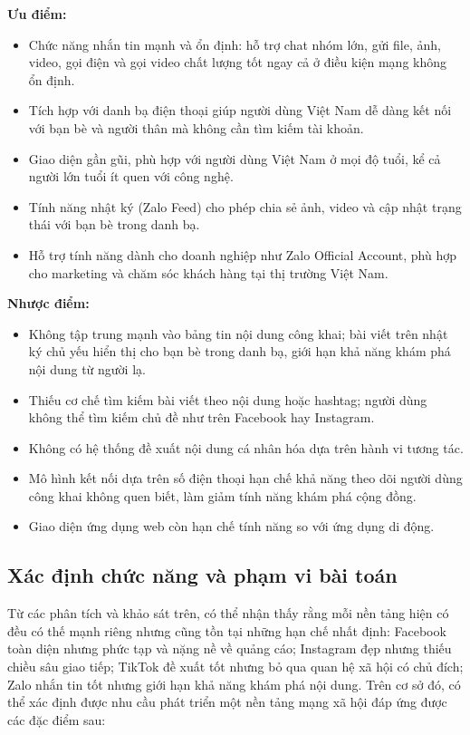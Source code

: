 \documentclass[../DoAn.tex]{subfiles}
\begin{document}
\noindent\textbf{Ưu điểm:}
\begin{itemize}
    \item Chức năng nhắn tin mạnh và ổn định: hỗ trợ chat nhóm lớn, gửi file, ảnh, video, gọi điện và gọi video chất lượng tốt ngay cả ở điều kiện mạng không ổn định.
    \item Tích hợp với danh bạ điện thoại giúp người dùng Việt Nam dễ dàng kết nối với bạn bè và người thân mà không cần tìm kiếm tài khoản.
    \item Giao diện gần gũi, phù hợp với người dùng Việt Nam ở mọi độ tuổi, kể cả người lớn tuổi ít quen với công nghệ.
    \item Tính năng nhật ký (Zalo Feed) cho phép chia sẻ ảnh, video và cập nhật trạng thái với bạn bè trong danh bạ.
    \item Hỗ trợ tính năng dành cho doanh nghiệp như Zalo Official Account, phù hợp cho marketing và chăm sóc khách hàng tại thị trường Việt Nam.
\end{itemize}

\noindent\textbf{Nhược điểm:}
\begin{itemize}
    \item Không tập trung mạnh vào bảng tin nội dung công khai; bài viết trên nhật ký chủ yếu hiển thị cho bạn bè trong danh bạ, giới hạn khả năng khám phá nội dung từ người lạ.
    \item Thiếu cơ chế tìm kiếm bài viết theo nội dung hoặc hashtag; người dùng không thể tìm kiếm chủ đề như trên Facebook hay Instagram.
    \item Không có hệ thống đề xuất nội dung cá nhân hóa dựa trên hành vi tương tác.
    \item Mô hình kết nối dựa trên số điện thoại hạn chế khả năng theo dõi người dùng công khai không quen biết, làm giảm tính năng khám phá cộng đồng.
    \item Giao diện ứng dụng web còn hạn chế tính năng so với ứng dụng di động.
\end{itemize}

\subsection{Xác định chức năng và phạm vi bài toán}
\label{subsection:2.1.3}
Từ các phân tích và khảo sát trên, có thể nhận thấy rằng mỗi nền tảng hiện có đều có thế mạnh riêng nhưng cũng tồn tại những hạn chế nhất định: Facebook toàn diện nhưng phức tạp và nặng nề về quảng cáo; Instagram đẹp nhưng thiếu chiều sâu giao tiếp; TikTok đề xuất tốt nhưng bỏ qua quan hệ xã hội có chủ đích; Zalo nhắn tin tốt nhưng giới hạn khả năng khám phá nội dung. Trên cơ sở đó, có thể xác định được nhu cầu phát triển một nền tảng mạng xã hội đáp ứng được các đặc điểm sau:
\end{document}
